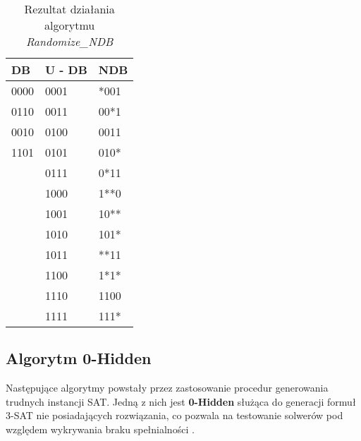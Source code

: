 \begin{table}[!htb]
    \centering
    \begin{tabular}{|l|l|l|}
    	\hline
    	DB   & U - DB & NDB  \\ \hline
    	0000 & 0001   & *001 \\
    	0110 & 0011   & 00*1 \\
    	0010 & 0100   & 0011 \\
    	1101 & 0101   & 010* \\
    	     & 0111   & 0*11 \\
    	     & 1000   & 1**0 \\
    	     & 1001   & 10**     \\
    	     & 1010   & 101*    \\
    	     & 1011   & **11     \\
    	     & 1100   & 1*1*     \\
    	     & 1110   & 1100    \\
    	     & 1111   & 111*     \\ \hline
    \end{tabular}
    \caption{Rezultat działania algorytmu \textit{Randomize\_NDB}}
    \label{tbl:randomized_results}
\end{table}

\newpage
\subsection{Algorytm 0-Hidden}
Następujące algorytmy powstały przez zastosowanie procedur generowania trudnych instancji SAT.
Jedną z nich jest \textbf{0-Hidden} służąca do generacji formuł 3-SAT nie posiadających rozwiązania, co pozwala na testowanie solwerów 
pod względem wykrywania braku spełnialności \cite{GeneratingHardFormulasByHidingSolutionsDeceptively}.

